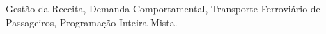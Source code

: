 



	\vspace{0.5cm}

	 Gestão da Receita, Demanda Comportamental, Transporte Ferroviário de Passageiros, Programação Inteira Mista.

